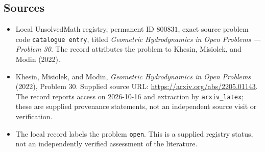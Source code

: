 \documentclass[11pt]{article}
\begin{document}
\subsection{Sources}
\begin{itemize}
\item Local UnsolvedMath registry, permanent ID \(800831\), exact source problem code \texttt{catalogue entry}, titled \emph{Geometric Hydrodynamics in Open Problems --- Problem 30}. The record attributes the problem to Khesin, Misiolek, and Modin (2022).
\item Khesin, Misiolek, and Modin, \emph{Geometric Hydrodynamics in Open Problems} (2022), Problem 30. Supplied source URL: \url{https://arxiv.org/abs/2205.01143}. The record reports access on 2026-10-16 and extraction by \texttt{arxiv\_latex}; these are supplied provenance statements, not an independent source visit or verification.
\item The local record labels the problem \texttt{open}. This is a supplied registry status, not an independently verified assessment of the literature.
\end{itemize}
\end{document}
